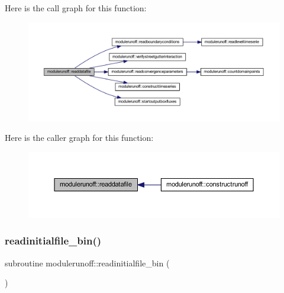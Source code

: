 Here is the call graph for this function\+:\nopagebreak
\begin{figure}[H]
\begin{center}
\leavevmode
\includegraphics[width=350pt]{namespacemodulerunoff_aa5edc73e0e11d57e48fd2c2b7dd60845_cgraph}
\end{center}
\end{figure}
Here is the caller graph for this function\+:\nopagebreak
\begin{figure}[H]
\begin{center}
\leavevmode
\includegraphics[width=350pt]{namespacemodulerunoff_aa5edc73e0e11d57e48fd2c2b7dd60845_icgraph}
\end{center}
\end{figure}
\mbox{\label{namespacemodulerunoff_abc7533c7bdb5fde4b69ad3d1db1b0b1a}} 
\subsubsection{\texorpdfstring{readinitialfile\+\_\+bin()}{readinitialfile\_bin()}}
{\footnotesize\ttfamily subroutine modulerunoff\+::readinitialfile\+\_\+bin (\begin{DoxyParamCaption}{ }\end{DoxyParamCaption})\hspace{0.3cm}{\ttfamily [private]}}

